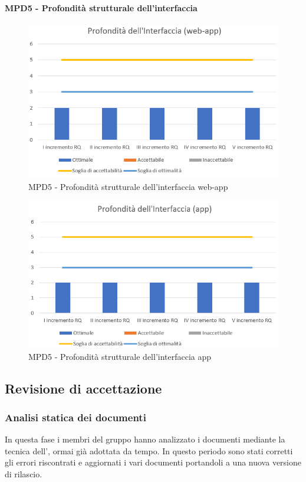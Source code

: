   \clearpage
  \paragraph{MPD5 - Profondità strutturale dell’interfaccia}
  \begin{figure}[h!]
    \centering
      \includegraphics[scale=1]{Immagini/ProfInter WA.PNG}
    \caption{MPD5 - Profondità strutturale dell’interfaccia web-app}
  \end{figure}

  \begin{figure}[h!]
    \centering
      \includegraphics[scale=1]{Immagini/ProfInter APP.PNG}
    \caption{MPD5 - Profondità strutturale dell’interfaccia app}
  \end{figure}

\subsection{Revisione di accettazione}
\subsubsection{Analisi statica dei documenti}
In questa fase i membri del gruppo \Gruppo{} hanno analizzato i documenti mediante la tecnica dell', ormai già adottata da tempo. In questo periodo sono stati corretti gli errori riscontrati e aggiornati i vari documenti portandoli a una nuova versione di rilascio.
